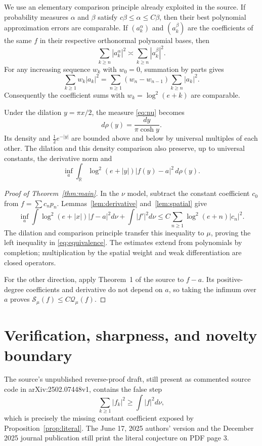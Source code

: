 \documentclass[11pt]{article}
\newcommand{\R}{\mathbb R}
\begin{document}
We use an elementary comparison principle already exploited in the source.
If probability measures $\alpha$ and $\beta$ satisfy
$c\beta\le\alpha\le C\beta$, then their best polynomial approximation
errors are comparable.  If $(a_k^\alpha)$ and $(a_k^\beta)$ are the
coefficients of the same $f$ in their respective orthonormal polynomial
bases, then
\[
 \sum_{k\ge n}|a_k^\alpha|^2\asymp
 \sum_{k\ge n}|a_k^\beta|^2.
\]
For any increasing sequence $w_k$ with $w_0=0$, summation by parts gives
\[
 \sum_{k\ge1}w_k|a_k|^2
 =\sum_{n\ge1}(w_n-w_{n-1})\sum_{k\ge n}|a_k|^2.
\]
Consequently the coefficient sums with
$w_k=\log^2(e+k)$ are comparable.

Under the dilation $y=\pi x/2$, the measure \eqref{eq:nu} becomes
\[
 d\rho(y)=\frac{dy}{\pi\cosh y}.
\]
Its density and $\tfrac12e^{-|y|}$ are bounded above and below by universal
multiples of each other.  The dilation and this density comparison also
preserve, up to universal constants, the derivative norm and
\[
 \inf_a\int_\R\log^2(e+|y|)|f(y)-a|^2\,d\rho(y).
\]

\begin{proof}[Proof of Theorem~\ref{thm:main}]
In the $\nu$ model, subtract the constant coefficient $c_0$ from
$f=\sum c_np_n$.  Lemmas~\ref{lem:derivative} and~\ref{lem:spatial} give
\[
 \inf_a\int\log^2(e+|x|)|f-a|^2d\nu+\int|f'|^2d\nu
 \le C\sum_{n\ge1}\log^2(e+n)|c_n|^2.
\]
The dilation and comparison principle transfer this inequality to $\mu$,
proving the left inequality in \eqref{eq:equivalence}.  The estimates extend
from polynomials by completion; multiplication by the spatial weight and
weak differentiation are closed operators.

For the other direction, apply Theorem~1 of the source to $f-a$.  Its
positive-degree coefficients and derivative do not depend on $a$, so taking
the infimum over $a$ proves
$\mathcal S_\mu(f)\le C\mathcal Q_\mu(f)$.
\end{proof}

\section{Verification, sharpness, and novelty boundary}

The source's unpublished reverse-proof draft, still present as commented
source code in arXiv:2502.07448v1, contains the false step
\[
 \sum_{k\ge1}|f_k|^2\ge\int|f|^2d\nu,
\]
which is precisely the missing constant coefficient exposed by
Proposition~\ref{prop:literal}.  The June 17, 2025 authors' version and the
December 2025 journal publication still print the literal conjecture on PDF
page 3.
\end{document}
